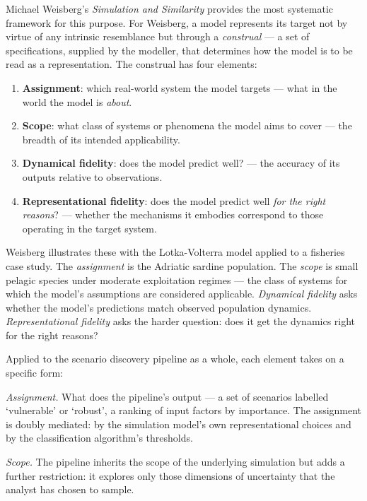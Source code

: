 \documentclass[sn-basic]{sn-jnl}%
\begin{document}
Michael Weisberg's \textit{Simulation and Similarity} \citep{weisberg_simulation_2013} provides the most systematic framework for this purpose. For Weisberg, a model represents its target not by virtue of any intrinsic resemblance but through a \textit{construal} --- a set of specifications, supplied by the modeller, that determines how the model is to be read as a representation. The construal has four elements:

\begin{enumerate}
    \item \textbf{Assignment}: which real-world system the model targets --- what in the world the model is \textit{about}.
    \item \textbf{Scope}: what class of systems or phenomena the model aims to cover --- the breadth of its intended applicability.
    \item \textbf{Dynamical fidelity}: does the model predict well? --- the accuracy of its outputs relative to observations.
    \item \textbf{Representational fidelity}: does the model predict well \textit{for the right reasons}? --- whether the mechanisms it embodies correspond to those operating in the target system.
\end{enumerate}

Weisberg illustrates these with the Lotka-Volterra model applied to a fisheries case study. The \textit{assignment} is the Adriatic sardine population. The \textit{scope} is small pelagic species under moderate exploitation regimes --- the class of systems for which the model's assumptions are considered applicable. \textit{Dynamical fidelity} asks whether the model's predictions match observed population dynamics. \textit{Representational fidelity} asks the harder question: does it get the dynamics right for the right reasons?

Applied to the scenario discovery pipeline as a whole, each element takes on a specific form:

\textit{Assignment.} What does the pipeline's output --- a set of scenarios labelled `vulnerable' or `robust', a ranking of input factors by importance. The assignment is doubly mediated: by the simulation model's own representational choices and by the classification algorithm's thresholds.

\textit{Scope.} The pipeline inherits the scope of the underlying simulation but adds a further restriction: it explores only those dimensions of uncertainty that the analyst has chosen to sample. 
\end{document}

